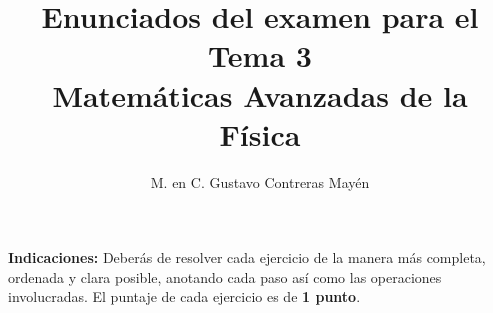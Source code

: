
\usepackage{apacite}
\title{Enunciados del examen para el Tema 3 \\[0.3em]  \large{Matemáticas Avanzadas de la Física}\vspace{-3ex}}
\author{M. en C. Gustavo Contreras Mayén}
\date{ }

\vspace{-4cm}
\maketitle
\fontsize{14}{14}\selectfont

\textbf{Indicaciones: } Deberás de resolver cada ejercicio de la manera más completa, ordenada y clara posible, anotando cada paso así como las operaciones involucradas. El puntaje de cada ejercicio es de \textbf{1 punto}.

